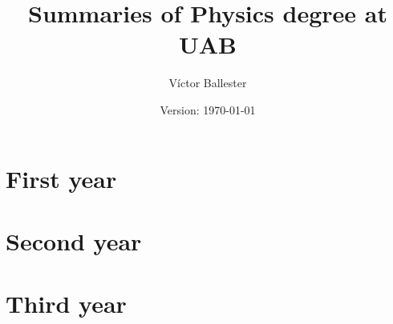 \documentclass[10pt,a4paper]{report}
\title{Summaries of Physics degree at UAB}
\author{Víctor Ballester}
\date{Version: \today}
\begin{document}
\maketitle
\newpage
\tableofcontents
\newpage

\cleardoublepage
\chapter{First year}
\newpage
%       


\cleardoublepage


\cleardoublepage

%       
\chapter{Second year}
\newpage
%       

%       


\cleardoublepage
\chapter{Third year}
\newpage


\cleardoublepage

\end{document}
